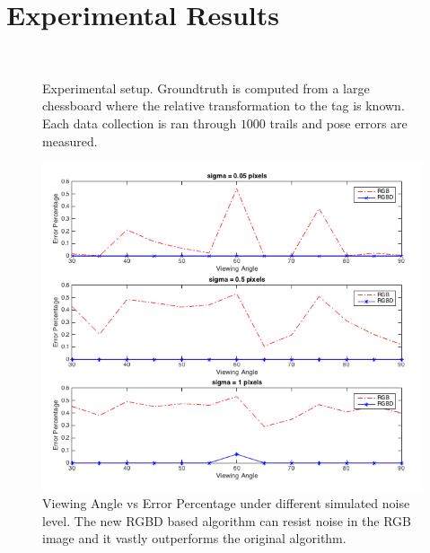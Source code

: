\section{Experimental Results}

\begin{figure}[h]
 \\
\caption{Experimental setup. Groundtruth is computed from a large chessboard where the relative transformation to the tag is known. Each data collection is ran through $1000$ trails and pose errors are measured.}
\label{fig:angle_result}
\end{figure}

\begin{figure}[h]
\centering
\includegraphics[width=\columnwidth]{figs/viewing_angle_fig1}
\caption{Viewing Angle vs Error Percentage under different simulated noise level. The new RGBD based algorithm can resist noise in the RGB image and it vastly outperforms the original algorithm.}
\label{fig:viewing_result}
\end{figure}

